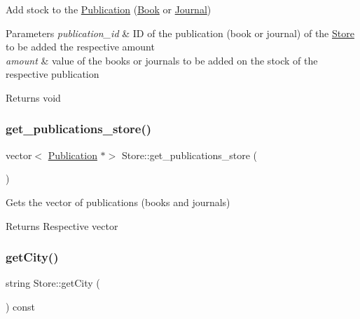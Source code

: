 Add stock to the \hyperlink{class_publication}{Publication} (\hyperlink{class_book}{Book} or \hyperlink{class_journal}{Journal}) 


\begin{DoxyParams}{Parameters}
{\em publication\+\_\+id} & ID of the publication (book or journal) of the \hyperlink{class_store}{Store} to be added the respective amount \\
\hline
{\em amount} & value of the books or journals to be added on the stock of the respective publication\\
\hline
\end{DoxyParams}
\begin{DoxyReturn}{Returns}
void 
\end{DoxyReturn}
\mbox{\label{class_store_a05e802d26ede5fc4225074d1c732b3f3}} 
\subsubsection{\texorpdfstring{get\+\_\+publications\+\_\+store()}{get\_publications\_store()}}
{\footnotesize\ttfamily vector$<$ \hyperlink{class_publication}{Publication} $\ast$$>$ Store\+::get\+\_\+publications\+\_\+store (\begin{DoxyParamCaption}{ }\end{DoxyParamCaption})}



Gets the vector of publications (books and journals) 

\begin{DoxyReturn}{Returns}
Respective vector 
\end{DoxyReturn}
\mbox{\label{class_store_a63032ec1afe4b301f55584a8018f478c}} 
\subsubsection{\texorpdfstring{get\+City()}{getCity()}}
{\footnotesize\ttfamily string Store\+::get\+City (\begin{DoxyParamCaption}{ }\end{DoxyParamCaption}) const}



